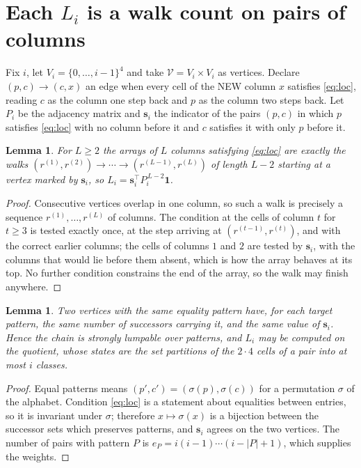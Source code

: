 \documentclass[11pt,a4paper]{article}
\theoremstyle{plain}
\newtheorem{lemma}[theorem]{Lemma}
\theoremstyle{definition}
\begin{document}
\section{Each $L_i$ is a walk count on pairs of columns}

Fix $i$, let $V_i=\{0,\dots,i-1\}^{4}$ and take $\mathcal V=V_i\times V_i$ as vertices.
Declare $(p,c)\to(c,x)$ an edge when every cell of the NEW column $x$ satisfies
\eqref{eq:loc}, reading $c$ as the column one step back and $p$ as the column two steps
back. Let $P_i$ be the adjacency matrix and $\mathbf{s}_i$ the indicator of the pairs
$(p,c)$ in which $p$ satisfies \eqref{eq:loc} with no column before it and $c$ satisfies it
with only $p$ before it.

\begin{lemma}\label{lem:walk}
For $L\ge2$ the arrays of $L$ columns satisfying \eqref{eq:loc} are exactly the walks
$(r^{(1)},r^{(2)})\to\cdots\to(r^{(L-1)},r^{(L)})$ of length $L-2$ starting at a
vertex marked by $\mathbf{s}_i$, so
$L_i=\mathbf{s}_i^{\!\top}P_i^{\,L-2}\mathbf{1}$.
\end{lemma}

\begin{proof}
Consecutive vertices overlap in one column, so such a walk is precisely a sequence
$r^{(1)},\dots,r^{(L)}$ of columns. The condition at the cells of column $t$ for $t\ge3$
is tested exactly once, at the step arriving at $(r^{(t-1)},r^{(t)})$, and with the
correct earlier columns; the cells of columns $1$ and $2$ are tested by $\mathbf{s}_i$, with
the columns that would lie before them absent, which is how the array behaves at its top. No
further condition constrains the end of the array, so the walk may finish anywhere.
\end{proof}

\begin{lemma}\label{lem:lump}
Two vertices with the same equality pattern have, for each target pattern, the same number of
successors carrying it, and the same value of $\mathbf{s}_i$. Hence the chain is strongly
lumpable over patterns, and $L_i$ may be computed on the quotient, whose states are the set
partitions of the $2\cdot4$ cells of a pair into at most $i$ classes.
\end{lemma}

\begin{proof}
Equal patterns means $(p',c')=(\sigma(p),\sigma(c))$ for a permutation $\sigma$ of the
alphabet. Condition \eqref{eq:loc} is a statement about equalities between entries, so it is
invariant under $\sigma$; therefore $x\mapsto\sigma(x)$ is a bijection between the successor
sets which preserves patterns, and $\mathbf{s}_i$ agrees on the two vertices. The number of
pairs with pattern $P$ is $e_P=i(i-1)\cdots(i-|P|+1)$, which supplies the weights.
\end{proof}
\end{document}

